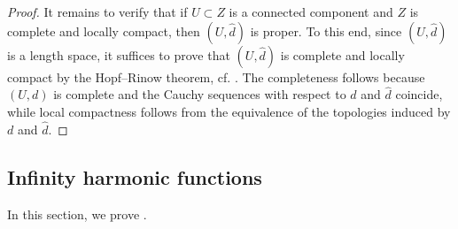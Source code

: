 \documentclass[reqno]{amsart}
\numberwithin{equation}{section}
\theoremstyle{remark}
\begin{document}
\begin{proof}
It remains to verify that if $U \subset Z$ is a connected component and $Z$ is complete and locally compact, then $( U, \widehat{d} )$ is proper. To this end, since $( U, \widehat{d} )$ is a length space, it suffices to prove that $( U, \widehat{d} )$ is complete and locally compact by the Hopf--Rinow theorem, cf. \cite[Theorem 2.5.28]{Bu:Bu:Iv:01}. The completeness follows because $( U, d )$ is complete and the Cauchy sequences with respect to $d$ and $\widehat{d}$ coincide, while local compactness follows from the equivalence of the topologies induced by $d$ and $\widehat{d}$.
\end{proof}









\subsection{Infinity harmonic functions}\label{sec:infinitharmonicfunctions}
In this section, we prove .
\end{document}
